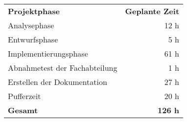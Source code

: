 \begin{tabular}{lr}
\rowcolor{heading}\textbf{Projektphase} & \textbf{Geplante Zeit} \\
Analysephase & 12 h \\
\rowcolor{odd}Entwurfsphase & 5 h \\
Implementierungsphase & 61 h \\
\rowcolor{odd}Abnahmetest der Fachabteilung & 1 h \\
Erstellen der Dokumentation & 27 h \\
\rowcolor{odd}Pufferzeit & 20 h \\
\hline
\hline
\textbf{Gesamt} & \textbf{126 h} \\
\end{tabular}
